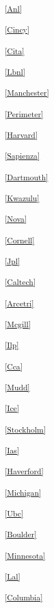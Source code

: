 \begin{multicols}{2}
\noindent
\textsuperscript{\ref{Anl}}\Anltext

\noindent
\textsuperscript{\ref{Cincy}}\Cincytext

\noindent
\textsuperscript{\ref{Cita}}\Citatext

\noindent
\textsuperscript{\ref{Lbnl}}\Lbnltext

\noindent
\textsuperscript{\ref{Manchester}}\Manchestertext

\noindent
\textsuperscript{\ref{Perimeter}}\Perimetertext

\noindent
\textsuperscript{\ref{Harvard}}\Harvardtext

\noindent
\textsuperscript{\ref{Sapienza}}\Sapienzatext

\noindent
\textsuperscript{\ref{Dartmouth}}\Dartmouthtext

\noindent
\textsuperscript{\ref{Kwazulu}}\Kwazulutext

\noindent
\textsuperscript{\ref{Nova}}\Novatext

\noindent
\textsuperscript{\ref{Cornell}}\Cornelltext

\noindent
\textsuperscript{\ref{Jpl}}\Jpltext

\noindent
\textsuperscript{\ref{Caltech}}\Caltechtext

\noindent
\textsuperscript{\ref{Arcetri}}\Arcetritext

\noindent
\textsuperscript{\ref{Mcgill}}\Mcgilltext

\noindent
\textsuperscript{\ref{Ilp}}\Ilptext

\noindent
\textsuperscript{\ref{Cca}}\Ccatext

\noindent
\textsuperscript{\ref{Mudd}}\Muddtext

\noindent
\textsuperscript{\ref{Ice}}\Icetext

\noindent
\textsuperscript{\ref{Stockholm}}\Stockholmtext

\noindent
\textsuperscript{\ref{Ias}}\Iastext

\noindent
\textsuperscript{\ref{Haverford}}\Haverfordtext

\noindent
\textsuperscript{\ref{Michigan}}\Michigantext

\noindent
\textsuperscript{\ref{Ubc}}\Ubctext

\noindent
\textsuperscript{\ref{Boulder}}\Bouldertext

\noindent
\textsuperscript{\ref{Minnesota}}\Minnesotatext

\noindent
\textsuperscript{\ref{Lal}}\Laltext

\noindent
\textsuperscript{\ref{Columbia}}\Columbiatext


\end{multicols}
